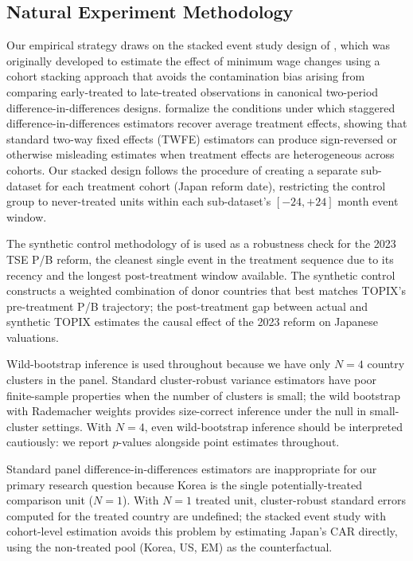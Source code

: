 \documentclass[12pt]{article}
\begin{document}
\subsection{Natural Experiment Methodology}

Our empirical strategy draws on the stacked event study design of \citet{cengiz2019}, which
was originally developed to estimate the effect of minimum wage changes using a cohort
stacking approach that avoids the contamination bias arising from comparing early-treated
to late-treated observations in canonical two-period difference-in-differences designs.
\citet{baker2022} formalize the conditions under which staggered difference-in-differences
estimators recover average treatment effects, showing that standard two-way fixed effects
(TWFE) estimators can produce sign-reversed or otherwise misleading estimates when
treatment effects are heterogeneous across cohorts. Our stacked design follows the
\citet{cengiz2019} procedure of creating a separate sub-dataset for each treatment cohort
(Japan reform date), restricting the control group to never-treated units within each
sub-dataset's $[-24, +24]$ month event window.

The synthetic control methodology of \citet{abadie2010} is used as a robustness check for
the 2023 TSE P/B reform, the cleanest single event in the treatment sequence due to its
recency and the longest post-treatment window available. The synthetic control constructs
a weighted combination of donor countries that best matches TOPIX's pre-treatment P/B
trajectory; the post-treatment gap between actual and synthetic TOPIX estimates the causal
effect of the 2023 reform on Japanese valuations.

Wild-bootstrap inference \citep{cameron2008} is used throughout because we have only $N=4$
country clusters in the panel. Standard cluster-robust variance estimators have poor finite-sample
properties when the number of clusters is small; the wild bootstrap with Rademacher
weights provides size-correct inference under the null in small-cluster settings. With
$N=4$, even wild-bootstrap inference should be interpreted cautiously: we report $p$-values
alongside point estimates throughout.

Standard panel difference-in-differences estimators are inappropriate for our primary
research question because Korea is the single potentially-treated comparison unit ($N=1$).
With $N=1$ treated unit, cluster-robust standard errors computed for the treated country
are undefined; the stacked event study with cohort-level estimation avoids this problem by
estimating Japan's CAR directly, using the non-treated pool (Korea, US, EM) as the
counterfactual.
\end{document}
